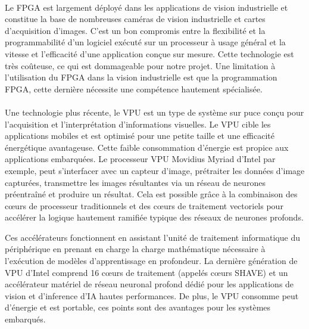 \paragraph{}
\label{sec:FPGA_hwInf}

Le \gls{FPGA} est largement déployé dans les applications de vision industrielle et constitue la base de nombreuses caméras de vision industrielle et cartes d'acquisition d'images. 
C'est un bon compromis entre la flexibilité et la programmabilité d'un logiciel exécuté sur un processeur à usage général et la vitesse et l'efficacité d'une application conçue sur mesure. 
Cette technologie est très coûteuse, ce qui est dommageable pour notre projet.
Une limitation à l'utilisation du \gls{FPGA} dans la vision industrielle est que la programmation \gls{FPGA}, cette dernière nécessite une compétence hautement spécialisée.

\paragraph{}
\label{sec:VPU_hwInf}

Une technologie plus récente, le \gls{VPU} est un type de système sur puce conçu pour l'acquisition et l'interprétation d'informations visuelles. 
Le \gls{VPU} cible les applications mobiles et est optimisé pour une petite taille et une efficacité énergétique avantageuse. 
Cette faible consommation d'énergie est propice aux applications embarquées. 
Le processeur \gls{VPU} Movidius Myriad d'Intel \cite{Movidius} par exemple, peut s'interfacer avec un capteur d'image, 
prétraiter les données d'image capturées, transmettre les images résultantes via un réseau de neurones préentraîné et produire un résultat. 
Cela est possible grâce à la combinaison des cœurs de processeur traditionnels et des cœurs de traitement vectoriels pour accélérer la logique hautement ramifiée typique des réseaux de neurones profonds.

Ces accélérateurs fonctionnent en assistant l'unité de traitement informatique du périphérique en prenant en charge la charge mathématique nécessaire à l'exécution de modèles d'apprentissage en profondeur. 
La dernière génération de \gls{VPU} d'Intel comprend 16 cœurs de traitement (appelés cœurs SHAVE) et un accélérateur matériel de réseau neuronal profond dédié pour les applications de vision et d'\gls{inference} d'\gls{IA} hautes performances.
De plus, le \gls{VPU} consomme peut d'énergie et est portable, ces points sont des avantages pour les systèmes embarqués.

